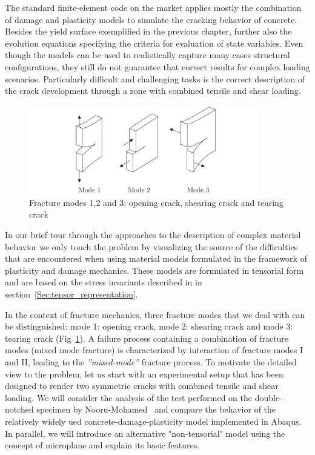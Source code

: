 \documentclass[main.tex]{subfiles}
\begin{document}
The standard finite-element code on the market applies mostly the combination of damage and plasticity models to simulate the cracking behavior of concrete. Besides the yield surface exemplified in the previous chapter, further also the evolution equations specifying the criteria for evaluation of state variables. 
Even though the models can be used to realistically capture many cases structural configurations, they still do not guarantee that correct results for complex loading scenarios. 
Particularly difficult and challenging tasks is the 
correct description of the crack development through a zone with combined tensile and shear loading.
\begin{figure}[h] 
    \centering
        \includegraphics[width=10cm]{fig/fracture_modes.pdf}
        \caption{Fracture modes 1,2 and 3: opening crack, shearing crack and tearing crack}
        \label{FIGfracturemodes}
\end{figure}

In our brief tour through the approaches to the description of complex material behavior we only touch 
the problem by visualizing the source of the difficulties that are encountered when using material models 
formulated in the framework of plasticity and damage mechanics. 
These models are formulated in tensorial form and are based on the stress invariants described 
in in section~\ref{Sec:tensor_representation}. 

In the context of fracture mechanics, three fracture modes that we deal with can be distinguished: 
mode 1: opening crack, 
mode 2: shearing crack and mode 3: 
tearing crack (Fig~\ref{FIGfracturemodes}). 
A failure process containing a combination of fracture modes (mixed mode fracture) 
is characterized by interaction of 
fracture modes I and II, leading to the \textit{''mixed-mode''} fracture process. 
To motivate the detailed view to the problem, let us start with an experimental setup that has been designed
to render two symmetric cracks with combined tensile and shear loading. 
We will consider the analysis of the test performed on the double-notched specimen 
by Nooru-Mohamed~\cite{nooru_mixed_1992} and compare the behavior of the 
relatively widely ued concrete-damage-plasticity model implemented in Abaqus.
In parallel, we will introduce an alternative "non-tensorial" model using the
concept of microplane and explain its basic features.
\end{document}
